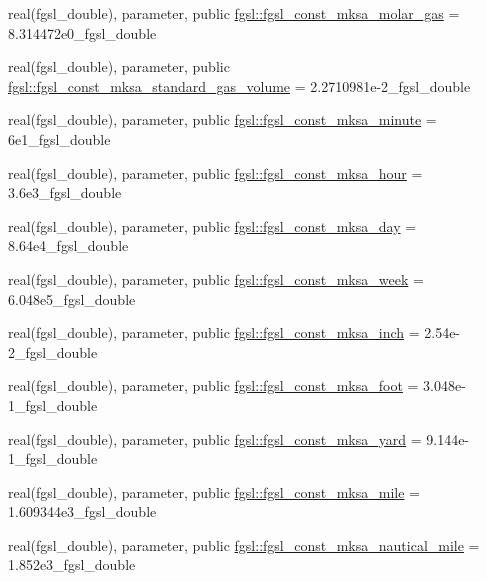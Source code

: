 \begin{DoxyCompactItemize}
\item 
real(fgsl\+\_\+double), parameter, public \hyperlink{namespacefgsl_aba418557adafd1575eab5108ba172cf7}{fgsl\+::fgsl\+\_\+const\+\_\+mksa\+\_\+molar\+\_\+gas} = 8.\+314472e0\+\_\+fgsl\+\_\+double
\item 
real(fgsl\+\_\+double), parameter, public \hyperlink{namespacefgsl_a43547e219346197d5b5b8c6adff614eb}{fgsl\+::fgsl\+\_\+const\+\_\+mksa\+\_\+standard\+\_\+gas\+\_\+volume} = 2.\+2710981e-\/2\+\_\+fgsl\+\_\+double
\item 
real(fgsl\+\_\+double), parameter, public \hyperlink{namespacefgsl_a5c0cc4ab0dc2be570d83ef0f9d2f4ba6}{fgsl\+::fgsl\+\_\+const\+\_\+mksa\+\_\+minute} = 6e1\+\_\+fgsl\+\_\+double
\item 
real(fgsl\+\_\+double), parameter, public \hyperlink{namespacefgsl_aa7d132341cda0d591f1452a894cf5855}{fgsl\+::fgsl\+\_\+const\+\_\+mksa\+\_\+hour} = 3.\+6e3\+\_\+fgsl\+\_\+double
\item 
real(fgsl\+\_\+double), parameter, public \hyperlink{namespacefgsl_af69acf253e04452510d9ec67efa458d2}{fgsl\+::fgsl\+\_\+const\+\_\+mksa\+\_\+day} = 8.\+64e4\+\_\+fgsl\+\_\+double
\item 
real(fgsl\+\_\+double), parameter, public \hyperlink{namespacefgsl_aecb67f391facbac682484e9d352dac5e}{fgsl\+::fgsl\+\_\+const\+\_\+mksa\+\_\+week} = 6.\+048e5\+\_\+fgsl\+\_\+double
\item 
real(fgsl\+\_\+double), parameter, public \hyperlink{namespacefgsl_a272689a26b0b7b5cd89f28713aa251d4}{fgsl\+::fgsl\+\_\+const\+\_\+mksa\+\_\+inch} = 2.\+54e-\/2\+\_\+fgsl\+\_\+double
\item 
real(fgsl\+\_\+double), parameter, public \hyperlink{namespacefgsl_acff74ed42941dc6324409ba0eee894ee}{fgsl\+::fgsl\+\_\+const\+\_\+mksa\+\_\+foot} = 3.\+048e-\/1\+\_\+fgsl\+\_\+double
\item 
real(fgsl\+\_\+double), parameter, public \hyperlink{namespacefgsl_a822a621129f787917e82b140d0814b72}{fgsl\+::fgsl\+\_\+const\+\_\+mksa\+\_\+yard} = 9.\+144e-\/1\+\_\+fgsl\+\_\+double
\item 
real(fgsl\+\_\+double), parameter, public \hyperlink{namespacefgsl_a6336ad4316ac012f6ae1ba2c951ec520}{fgsl\+::fgsl\+\_\+const\+\_\+mksa\+\_\+mile} = 1.\+609344e3\+\_\+fgsl\+\_\+double
\item 
real(fgsl\+\_\+double), parameter, public \hyperlink{namespacefgsl_a035a322332ff494af9c3ecfb5dca6125}{fgsl\+::fgsl\+\_\+const\+\_\+mksa\+\_\+nautical\+\_\+mile} = 1.\+852e3\+\_\+fgsl\+\_\+double
\item 

\end{DoxyCompactItemize}
